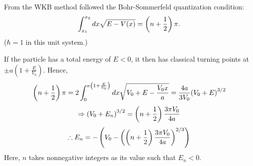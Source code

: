 \item
From the WKB method followed the Bohr-Sommerfeld quantization condition:
\[
	\int_{x_1}^{x_2} dx \sqrt{E - V(x)} = \left( n + \frac{1}{2} \right) \pi.
\]
($\hbar = 1$ in this unit system.)

If the particle has a total energy of $E < 0$, it then has classical turning points at $\pm a \left( 1 + \frac{E}{V_0} \right)$.
Hence,
\[
	\left( n + \frac{1}{2} \right) \pi
	= 2 \int_0^{a \left( 1 + \frac{E}{V_0} \right)} dx \sqrt{V_0 + E - \frac{V_0 x}{a}}
	= \frac{4a}{3V_0} {\left( V_0 + E \right)}^{3/2}
\]
\[
	\Rightarrow {\left( V_0 + E_n \right)}^{3/2} = \left( n + \frac{1}{2} \right) \frac{3\pi V_0}{4a}
\]
\[
	\therefore E_n = -\left(
	V_0 - {\left( \left( n + \frac{1}{2} \right) \frac{3\pi V_0}{4a} \right)}^{2/3}
	\right)
\]
Here, $n$ takes nonnegative integers as its value such that $E_n < 0$.